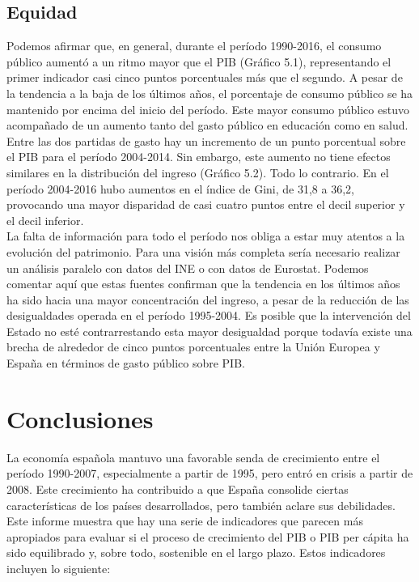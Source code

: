     \subsection{Equidad}
    Podemos afirmar que, en general, durante el período 1990-2016, el consumo público aumentó a un ritmo mayor que el PIB (Gráfico 5.1), representando el primer indicador casi cinco puntos porcentuales más que el segundo. A pesar de la tendencia a la baja de los últimos años, el porcentaje de consumo público se ha mantenido por encima del inicio del período. Este mayor consumo público estuvo acompañado de un aumento tanto del gasto público en educación como en salud. Entre las dos partidas de gasto hay un incremento de un punto porcentual sobre el PIB para el período 2004-2014. Sin embargo, este aumento no tiene efectos similares en la distribución del ingreso (Gráfico 5.2). Todo lo contrario. En el período 2004-2016 hubo aumentos en el índice de Gini, de 31,8 a 36,2, provocando una mayor disparidad de casi cuatro puntos entre el decil superior y el decil inferior.\\
    La falta de información para todo el período nos obliga a estar muy atentos a la evolución del patrimonio. Para una visión más completa sería necesario realizar un análisis paralelo con datos del INE o con datos de Eurostat. Podemos comentar aquí que estas fuentes confirman que la tendencia en los últimos años ha sido hacia una mayor concentración del ingreso, a pesar de la reducción de las desigualdades operada en el período 1995-2004. Es posible que la intervención del Estado no esté contrarrestando esta mayor desigualdad porque todavía existe una brecha de alrededor de cinco puntos porcentuales entre la Unión Europea y España en términos de gasto público sobre PIB.

    \section{Conclusiones}	
    La economía española mantuvo una favorable senda de crecimiento entre el período 1990-2007, especialmente a partir de 1995, pero entró en crisis a partir de 2008. Este crecimiento ha contribuido a que España consolide ciertas características de los países desarrollados, pero también aclare sus debilidades. Este informe muestra que hay una serie de indicadores que parecen más apropiados para evaluar si el proceso de crecimiento del PIB o PIB per cápita ha sido equilibrado y, sobre todo, sostenible en el largo plazo. Estos indicadores incluyen lo siguiente:

